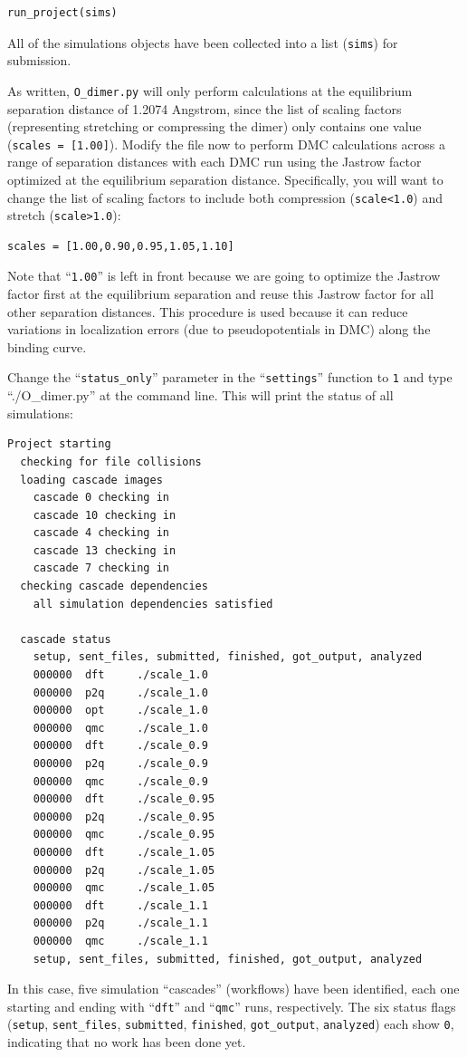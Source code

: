 \begin{lstlisting}
run_project(sims)
\end{lstlisting}
\noindent
All of the simulations objects have been collected into a list (\texttt{sims}) for submission.

As written, \texttt{O\_dimer.py} will only perform calculations at the equilibrium separation distance of 1.2074 Angstrom, since the list of scaling factors (representing stretching or compressing the dimer) only contains one value (\texttt{scales = [1.00]}).  Modify the file now to perform DMC calculations across a range of separation distances with each DMC run using the Jastrow factor optimized at the equilibrium separation distance.  Specifically, you will want to change the list of scaling factors to include both compression (\texttt{scale<1.0}) and stretch (\texttt{scale>1.0}): 
\begin{lstlisting}
scales = [1.00,0.90,0.95,1.05,1.10]
\end{lstlisting}
\noindent
Note that ``\texttt{1.00}'' is left in front because we are going to optimize the Jastrow factor first at the equilibrium separation and reuse this Jastrow factor for all other separation distances.  This procedure is used because it can reduce variations in localization errors (due to pseudopotentials in DMC) along the binding curve. 

Change the ``\texttt{status\_only}'' parameter in the ``\texttt{settings}'' function to \texttt{1} and type ``./O\_dimer.py'' at the command line.  This will print the status of all simulations:
\begin{shaded}
\begin{verbatim}
Project starting 
  checking for file collisions 
  loading cascade images 
    cascade 0 checking in 
    cascade 10 checking in 
    cascade 4 checking in 
    cascade 13 checking in 
    cascade 7 checking in 
  checking cascade dependencies 
    all simulation dependencies satisfied 
  
  cascade status 
    setup, sent_files, submitted, finished, got_output, analyzed 
    000000  dft     ./scale_1.0 
    000000  p2q     ./scale_1.0 
    000000  opt     ./scale_1.0 
    000000  qmc     ./scale_1.0 
    000000  dft     ./scale_0.9 
    000000  p2q     ./scale_0.9 
    000000  qmc     ./scale_0.9 
    000000  dft     ./scale_0.95 
    000000  p2q     ./scale_0.95 
    000000  qmc     ./scale_0.95 
    000000  dft     ./scale_1.05 
    000000  p2q     ./scale_1.05 
    000000  qmc     ./scale_1.05 
    000000  dft     ./scale_1.1 
    000000  p2q     ./scale_1.1 
    000000  qmc     ./scale_1.1 
    setup, sent_files, submitted, finished, got_output, analyzed 
\end{verbatim}
\end{shaded}
\noindent
In this case, five simulation ``cascades'' (workflows) have been identified, each one starting and ending with ``\texttt{dft}'' and ``\texttt{qmc}'' runs, respectively.  The six status flags (\texttt{setup}, \texttt{sent\_files}, \texttt{submitted}, \texttt{finished}, \texttt{got\_output}, \texttt{analyzed}) each show \texttt{0}, indicating that no work has been done yet.  

